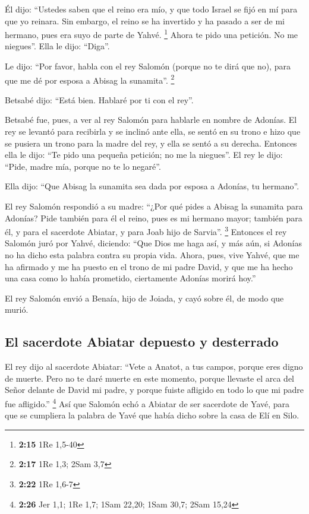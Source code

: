  Él dijo: ``Ustedes saben que el reino era mío, y que
todo Israel se fijó en mí para que yo reinara. Sin embargo, el reino se
ha invertido y ha pasado a ser de mi hermano, pues era suyo de parte de
Yahvé. \footnote{\textbf{2:15} 1Re 1,5-40}  Ahora te pido
una petición. No me niegues''. Ella le dijo: ``Diga''.

 Le dijo: ``Por favor, habla con el rey Salomón (porque
no te dirá que no), para que me dé por esposa a Abisag la sunamita''.
\footnote{\textbf{2:17} 1Re 1,3; 2Sam 3,7}

 Betsabé dijo: ``Está bien. Hablaré por ti con el rey''.

 Betsabé fue, pues, a ver al rey Salomón para hablarle en
nombre de Adonías. El rey se levantó para recibirla y se inclinó ante
ella, se sentó en su trono e hizo que se pusiera un trono para la madre
del rey, y ella se sentó a su derecha.  Entonces ella le
dijo: ``Te pido una pequeña petición; no me la niegues''. El rey le
dijo: ``Pide, madre mía, porque no te lo negaré''.

 Ella dijo: ``Que Abisag la sunamita sea dada por esposa
a Adonías, tu hermano''.

 El rey Salomón respondió a su madre: ``¿Por qué pides a
Abisag la sunamita para Adonías? Pide también para él el reino, pues es
mi hermano mayor; también para él, y para el sacerdote Abiatar, y para
Joab hijo de Sarvia''. \footnote{\textbf{2:22} 1Re 1,6-7}
 Entonces el rey Salomón juró por Yahvé, diciendo: ``Que
Dios me haga así, y más aún, si Adonías no ha dicho esta palabra contra
su propia vida.  Ahora, pues, vive Yahvé, que me ha
afirmado y me ha puesto en el trono de mi padre David, y que me ha hecho
una casa como lo había prometido, ciertamente Adonías morirá hoy.''

 El rey Salomón envió a Benaía, hijo de Joiada, y cayó
sobre él, de modo que murió.

\hypertarget{el-sacerdote-abiatar-depuesto-y-desterrado}{%
\subsection{El sacerdote Abiatar depuesto y
desterrado}\label{el-sacerdote-abiatar-depuesto-y-desterrado}}

 El rey dijo al sacerdote Abiatar: ``Vete a Anatot, a tus
campos, porque eres digno de muerte. Pero no te daré muerte en este
momento, porque llevaste el arca del Señor delante de David mi padre, y
porque fuiste afligido en todo lo que mi padre fue afligido.''
\footnote{\textbf{2:26} Jer 1,1; 1Re 1,7; 1Sam 22,20; 1Sam 30,7; 2Sam
  15,24}  Así que Salomón echó a Abiatar de ser sacerdote
de Yavé, para que se cumpliera la palabra de Yavé que había dicho sobre
la casa de Elí en Silo.

